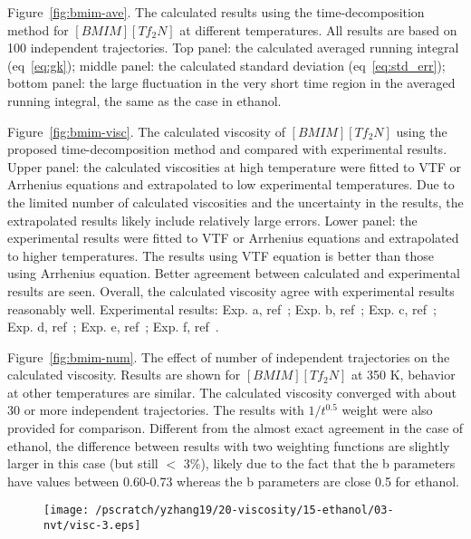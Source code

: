 \documentclass[12pt]{article}
\begin{document}
Figure~\ref{fig:bmim-ave}.
The calculated results using the time-decomposition method for $[BMIM][Tf_2N]$ at different temperatures.
All results are based on 100 independent trajectories.
Top panel: the calculated averaged running integral (eq~\ref{eq:gk});
middle panel: the calculated standard deviation (eq~\ref{eq:std_err});
bottom panel: the large fluctuation in the very short time region in the averaged running integral,
the same as the case in ethanol.

Figure~\ref{fig:bmim-visc}.
The calculated viscosity of $[BMIM][Tf_2N]$ using the proposed time-decomposition method
and compared with experimental results.
Upper panel: the calculated viscosities at high temperature were fitted to VTF or Arrhenius equations
and extrapolated to low experimental temperatures.
Due to the limited number of calculated viscosities and the uncertainty in the results,
the extrapolated results likely include relatively large errors.
Lower panel: the experimental results were fitted to VTF or Arrhenius equations
and extrapolated to higher temperatures.
The results using VTF equation is better than those using Arrhenius equation.
Better agreement between calculated and experimental results are seen.
Overall, the calculated viscosity agree with experimental results reasonably well.
Experimental results: 
Exp. a, ref~\cite{Gadzuric.JCED.57.1072.2012};
Exp. b, ref~\cite{Katsuta.JCED.55.1588.2010};
Exp. c, ref~\cite{Watanabe.JPCB.110.19593.2006};
Exp. d, ref~\cite{Majer.GC.8.172.2006};
Exp. e, ref~\cite{Watanabe.JPCB.109.6103.2005};
Exp. f, ref~\cite{VanderNoot.JEC.568.167.2004}.

Figure~\ref{fig:bmim-num}.
The effect of number of independent trajectories on the calculated viscosity.
Results are shown for $[BMIM][Tf_2N]$ at 350 K, behavior at other temperatures are similar.
The calculated viscosity converged with about 30 or more independent trajectories.
The results with $1/t^{0.5}$ weight were also provided for comparison.
Different from the almost exact agreement in the case of ethanol,
the difference between results with two weighting functions are slightly larger in this case
(but still $<$ 3\%),
likely due to the fact that the b parameters have values between 0.60-0.73
whereas the b parameters are close 0.5 for ethanol.




\newpage
\clearpage
\begin{figure}
\begin{center}
\texttt{[image: /pscratch/yzhang19/20-viscosity/15-ethanol/03-nvt/visc-3.eps]}
\caption{}
\label{fig:visc-longtraj}
\end{center}
\end{figure}
\end{document}
